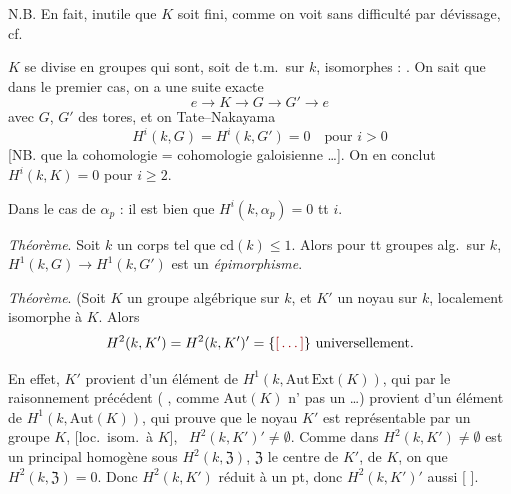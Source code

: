 \documentclass[11pt,a4paper]{article}
\begin{document}
N.B. En fait, inutile que $K$ soit fini, comme on voit sans difficulté
par dévissage, cf.

$K$ se divise en groupes qui sont, soit de t.m.\ sur $k$,
 \ill{} isomorphes :
. On sait que dans le premier cas, on a une suite
exacte
\[
e \to K \to G \to G' \to e
\]
avec $G$, $G'$ des tores, et on \ill{} Tate--Nakayama
\[
H^i(k,G) = H^i(k,G') = 0 \quad \text{pour } i > 0
\]
[NB. \ill{} \ill{} que la cohomologie  = cohomologie
galoisienne \ldots]. On en conclut 
$H^i(k,K) = 0$ pour $i \geq 2$.

Dans le cas de $\alpha_p$ : il est bien  \ill{} \ill{}
que $H^i(k, \alpha_p) = 0$ tt $i$.


\emph{Théorème}. Soit $k$ un corps tel que $\mathrm{cd}(k) \leq 1$.
Alors pour tt 
 groupes alg.\ sur $k$,
$H^1(k,G) \to H^1(k,G')$ est un \emph{épimorphisme}.



\emph{Théorème}. (Soit $K$ un groupe algébrique sur $k$, et $K'$
un noyau sur $k$, localement isomorphe à $K$. Alors
\[
H^2(k,K') = H^2(k,K')' = \{\ill{}\} \ \text{universellement}.
\]

En effet, $K'$ provient d'un élément de
$H^1(k, \mathrm{Aut\,Ext}(K))$, qui par le raisonnement précédent
( , comme
$\mathrm{Aut}(K)$ n' pas un 
\ldots)
provient d'un élément de $H^1(k, \mathrm{Aut}(K))$,  qui
prouve que le noyau $K'$ est représentable par un groupe $K$,
[loc.\ isom.\ à $K$],  \ $H^2(k,K')' \neq \emptyset$.
Comme  dans $H^2(k,K') \neq \emptyset$ est un
 principal homogène sous $H^2(k,\mathfrak{Z})$,
$\mathfrak{Z}$ le centre de $K'$, \ill{} \ill{} de $K$, on \ill{}
 que $H^2(k,\mathfrak{Z}) = 0$. Donc $H^2(k,K')$ réduit à
un pt, donc $H^2(k,K')'$ aussi [\ill{} \ill{} \ill{} \ill{} \ill{} \ill{}].
\end{document}
